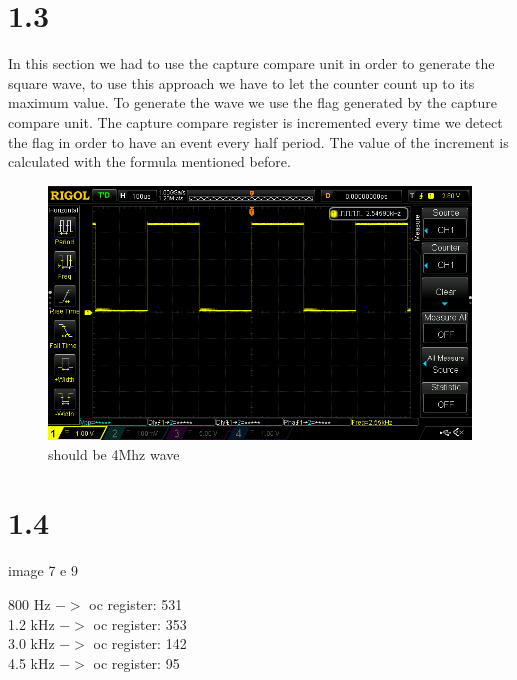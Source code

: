 \documentclass[12pt]{article}
\begin{document}
\section*{1.3}
In this section we had to use the capture compare unit in order to generate the square wave, to use this approach we have to let the counter count up to its maximum value. To generate the wave we use the flag generated by the capture compare unit. The capture compare register is incremented every time we detect the flag in order to have an event every half period. The value of the increment is calculated with the formula mentioned before.
\begin{figure}[h!]
	
	\includegraphics[scale = 0.4]{immagini/DS1Z_QuickPrint6}
	\caption{should be 4Mhz wave }
\end{figure}


\section*{1.4 }
image 7 e 9

800 Hz \space $->$ oc register: 531\\
1.2 kHz $->$ oc register: 353\\
3.0 kHz $->$ oc register: 142\\
4.5 kHz $->$ oc register: 95\\
\end{document}
